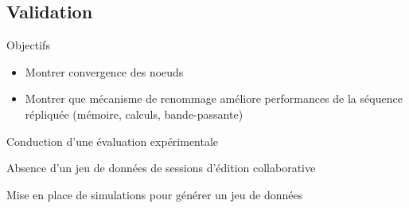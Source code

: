 \subsection{Validation}

\begin{frame}{Objectifs}
  \begin{itemize}
    \item Montrer convergence des noeuds
    \item Montrer que mécanisme de renommage améliore performances de la séquence répliquée (mémoire, calculs, bande-passante)
  \end{itemize}
  \pause
  \begin{center}
    \alert{Conduction d'une évaluation expérimentale}
  \end{center}
\end{frame}

\begin{frame}[standout]
  \alert{Absence d'un jeu de données de sessions d'édition collaborative}

  \medskip
  \pause
  Mise en place de simulations pour générer un jeu de données
\end{frame}

